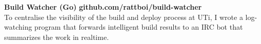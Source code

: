   \item 
  \headerrow 
  {\textbf{Build Watcher (Go)}}
  {\textbf{github.com/rattboi/build-watcher}}
  \\
  To centralise the visibility of the build and deploy process at UTi, I wrote a log-watching program that forwards intelligent build results to an IRC bot that summarizes the work in realtime.

